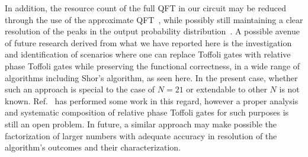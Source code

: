 \clearpage
\noindent
 In addition, the resource count of the full \acs{QFT} in our circuit may be reduced through the use of the approximate \acs{QFT}~\cite{Barenco_1996}, while possibly still maintaining a clear resolution of the peaks in the output probability distribution~\cite{Coppersmith_2002}. A possible avenue of future research derived from what we have reported here is the investigation and identification of scenarios where one can replace Toffoli gates with relative phase Toffoli gates while preserving the functional correctness, in a wide range of algorithms including Shor's algorithm, as seen here. In the present case, whether such an approach is special to the case of $N=21$ or extendable to other $N$ is not known. Ref.~\cite{Maslov_2016} has performed some work in this regard, however a proper analysis and systematic composition of relative phase Toffoli gates for such purposes is still an open problem. In future, a similar approach may make possible the factorization of larger numbers with adequate accuracy in resolution of the algorithm's outcomes and their characterization.

